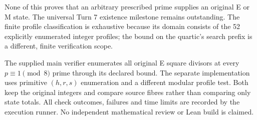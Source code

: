 None of this proves that an arbitrary prescribed prime supplies an original E
or M state. The universal Turn 7 existence milestone remains outstanding. The
finite profile classification is exhaustive because its domain consists of the
52 explicitly enumerated integer profiles; the bound on the quartic's search
prefix is a different, finite verification scope.

The supplied main verifier enumerates all original E square divisors at every
$p\equiv1\pmod8$ prime through its declared bound. The separate implementation
uses primitive $(h,r,s)$ enumeration and a different modular profile test. Both
keep the original integers and compare source fibres rather than comparing only
state totals. All check outcomes, failures and time limits are recorded by the
execution runner. No independent mathematical review or Lean build is claimed.

